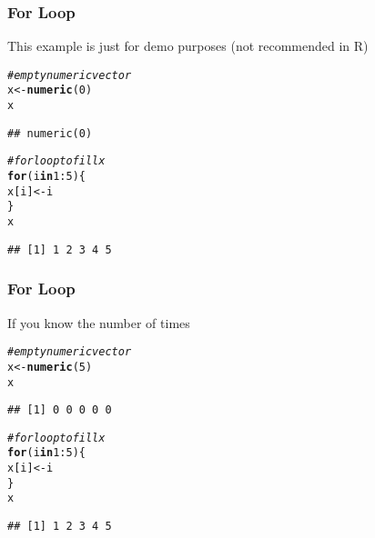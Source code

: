 \documentclass[12pt]{beamer}\usepackage[]{graphicx}\usepackage[]{color}
\makeatletter
\newcommand{\hlnum}[1]{\textcolor[rgb]{0.686,0.059,0.569}{#1}}%
\newcommand{\hlcom}[1]{\textcolor[rgb]{0.678,0.584,0.686}{\textit{#1}}}%
\newcommand{\hlopt}[1]{\textcolor[rgb]{0,0,0}{#1}}%
\newcommand{\hlstd}[1]{\textcolor[rgb]{0.345,0.345,0.345}{#1}}%
\newcommand{\hlkwa}[1]{\textcolor[rgb]{0.161,0.373,0.58}{\textbf{#1}}}%
\newcommand{\hlkwb}[1]{\textcolor[rgb]{0.69,0.353,0.396}{#1}}%
\newcommand{\hlkwd}[1]{\textcolor[rgb]{0.737,0.353,0.396}{\textbf{#1}}}%
\newenvironment{kframe}{%
 \def\at@end@of@kframe{}%
 \ifinner\ifhmode%
  \def\at@end@of@kframe{\end{minipage}}%
  \begin{minipage}{\columnwidth}%
 \fi\fi%
 \def\FrameCommand##1{\hskip\@totalleftmargin \hskip-\fboxsep
 \colorbox{shadecolor}{##1}\hskip-\fboxsep
     \hskip-\linewidth \hskip-\@totalleftmargin \hskip\columnwidth}%
 \MakeFramed {\advance\hsize-\width
   \@totalleftmargin\z@ \linewidth\hsize
   \@setminipage}}%
 {\par\unskip\endMakeFramed%
 \at@end@of@kframe}
\newenvironment{knitrout}{}{} %
\makeatother
\begin{document}

\begin{frame}[fragile]
\frametitle{For Loop}

This example is just for demo purposes (not recommended in R)
\begin{knitrout}\footnotesize
{}\color{fgcolor}\begin{kframe}
\begin{alltt}
\hlcom{# empty numeric vector}
\hlstd{x} \hlkwb{<-} \hlkwd{numeric}\hlstd{(}\hlnum{0}\hlstd{)}
\hlstd{x}
\end{alltt}
\begin{verbatim}
## numeric(0)
\end{verbatim}
\begin{alltt}
\hlcom{# for loop to fill x}
\hlkwa{for} \hlstd{(i} \hlkwa{in} \hlnum{1}\hlopt{:}\hlnum{5}\hlstd{) \{}
  \hlstd{x[i]} \hlkwb{<-} \hlstd{i}
\hlstd{\}}
\hlstd{x}
\end{alltt}
\begin{verbatim}
## [1] 1 2 3 4 5
\end{verbatim}
\end{kframe}
\end{knitrout}

\end{frame}


\begin{frame}[fragile]
\frametitle{For Loop}

If you know the number of times
\begin{knitrout}\footnotesize
{}\color{fgcolor}\begin{kframe}
\begin{alltt}
\hlcom{# empty numeric vector}
\hlstd{x} \hlkwb{<-} \hlkwd{numeric}\hlstd{(}\hlnum{5}\hlstd{)}
\hlstd{x}
\end{alltt}
\begin{verbatim}
## [1] 0 0 0 0 0
\end{verbatim}
\begin{alltt}
\hlcom{# for loop to fill x}
\hlkwa{for} \hlstd{(i} \hlkwa{in} \hlnum{1}\hlopt{:}\hlnum{5}\hlstd{) \{}
  \hlstd{x[i]} \hlkwb{<-} \hlstd{i}
\hlstd{\}}
\hlstd{x}
\end{alltt}
\begin{verbatim}
## [1] 1 2 3 4 5
\end{verbatim}
\end{kframe}
\end{knitrout}

\end{frame}
\end{document}
